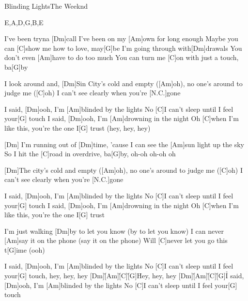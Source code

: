 \documentclass[../main.tex]{subfiles}
\begin{document}
\begin{song}[3]{Blinding Lights}{The Weeknd}{}
\begin{tabline}{4}{6}{8}{E,A,D,G,B,E}
		\nextbar
		
		\nextbar
		
		\nextbar
		
		\nextbar
\end{tabline}

I've been tryna [Dm]call
I've been on my [Am]own for long enough
Maybe you can [C]show me how to love, may[G]be
I'm going through with[Dm]drawals
You don't even [Am]have to do too much
You can turn me [C]on with just a touch, ba[G]by

I look around and, [Dm]Sin City's cold and empty ([Am]oh), no one's around to judge me ([C]oh)
I can't see clearly when you're [N.C.]gone

I said, [Dm]ooh, I'm [Am]blinded by the lights
No [C]I can't sleep until I feel your[G] touch
I said, [Dm]ooh, I'm [Am]drowning in the night
Oh [C]when I'm like this, you're the one I[G] trust (hey, hey, hey)

[Dm] \hh [Am] \hh [C] \hh [G] \hh
I'm running out of [Dm]time, 'cause I can see the [Am]sun light up the sky
So I hit the [C]road in overdrive, ba[G]by, oh-oh oh-oh oh

[Dm]The city's cold and empty ([Am]oh), no one's around to judge me ([C]oh)
I can't see clearly when you're [N.C.]gone

I said, [Dm]ooh, I'm [Am]blinded by the lights
No [C]I can't sleep until I feel your[G] touch
I said, [Dm]ooh, I'm [Am]drowning in the night
Oh [C]when I'm like this, you're the one I[G] trust

I'm just walking [Dm]by to let you know (by to let you know)
I can never [Am]say it on the phone (say it on the phone)
Will [C]never let you go this t[G]ime (ooh)

I said, [Dm]ooh, I'm [Am]blinded by the lights
No [C]I can't sleep until I feel your[G] touch, hey, hey, hey [Dm]\h [Am]\h [C]\h [G]\h 
Hey, hey, hey [Dm]\h [Am]\h [C]\h [G]\h 

I said, [Dm]ooh, I'm [Am]blinded by the lights
No [C]I can't sleep until I feel your[G] touch

\end{song}
\end{document}
